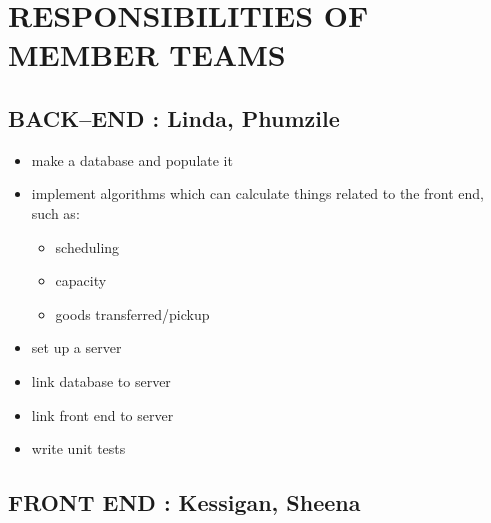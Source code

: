 \documentclass[paper=a4, fontsize=11pt]{scrartcl} %
\numberwithin{equation}{section} %
\numberwithin{figure}{section} %
\numberwithin{table}{section} %
\begin{document}


\section{RESPONSIBILITIES OF MEMBER TEAMS}


\subsection{	BACK--END : Linda, Phumzile}


\begin{itemize}
	\item  make a database and populate it
	\item  implement algorithms which can calculate things related to the front end, such as:
		\begin{itemize}
		 \item scheduling
		\item capacity
		\item goods transferred/pickup 
		\end{itemize}
	\item set up a server
	\item link database to server
	\item	link front end to server
	\item	write unit tests  
\end{itemize}




\subsection{	FRONT END : Kessigan, Sheena}
\end{document}
